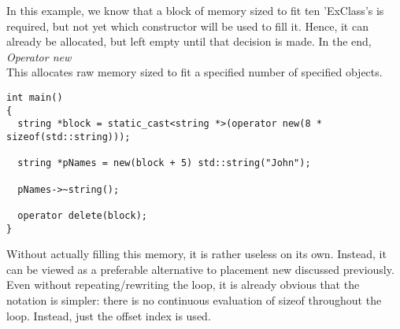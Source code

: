 In this example, we know that a block of memory sized to fit ten 'ExClass's is required, but not yet which constructor will be used to fill it. Hence, it can already be allocated, but left empty until that decision is made. In the end, \\

\textit{Operator new} \\
This allocates raw memory sized to fit a specified number of specified objects.
\begin{lstlisting}[style=inline]
int main()
{
  string *block = static_cast<string *>(operator new(8 * sizeof(std::string)));

  string *pNames = new(block + 5) std::string("John");

  pNames->~string();

  operator delete(block);
}
\end{lstlisting}

Without actually filling this memory, it is rather useless on its own. Instead, it can be viewed as a preferable alternative to placement new discussed previously. Even without repeating/rewriting the loop, it is already obvious that the notation is simpler: there is no continuous evaluation of sizeof throughout the loop. Instead, just the offset index is used.
